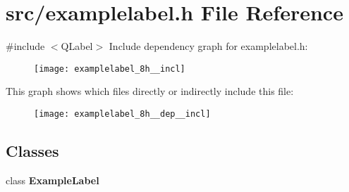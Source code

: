 \section{src/examplelabel.h File Reference}
\label{examplelabel_8h}
{\ttfamily \#include $<$Q\+Label$>$}\newline
Include dependency graph for examplelabel.\+h\+:\nopagebreak
\begin{figure}[H]
\begin{center}
\leavevmode
\texttt{[image: examplelabel\_8h\_\_incl]}
\end{center}
\end{figure}
This graph shows which files directly or indirectly include this file\+:\nopagebreak
\begin{figure}[H]
\begin{center}
\leavevmode
\texttt{[image: examplelabel\_8h\_\_dep\_\_incl]}
\end{center}
\end{figure}
\subsection*{Classes}
\begin{DoxyCompactItemize}
\item 
class \textbf{ Example\+Label}
\end{DoxyCompactItemize}
